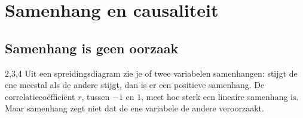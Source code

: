 \section{Samenhang en causaliteit}

\subsection{Samenhang is geen oorzaak}

\begin{alleenvoor}{2,3,4}
Uit een spreidingsdiagram zie je of twee variabelen samenhangen: stijgt de ene meestal als de andere stijgt, dan is er een positieve samenhang. De correlatiecoëfficiënt $r$, tussen $-1$ en $1$, meet hoe sterk een lineaire samenhang is. Maar samenhang zegt niet dat de ene variabele de andere veroorzaakt.
\end{alleenvoor}
